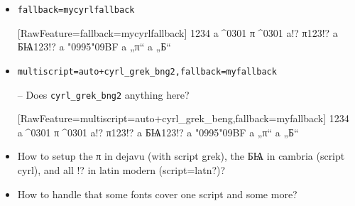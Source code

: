 \documentclass{article}
\newcommand\testtext{1234 a^^^^0301 π^^^^0301 a!? π123!? a БѨ123!? a \char"0995\char"09BF a „π“ a „Б“}
\begin{document}
\begin{itemize}
\item \verb+fallback=mycyrlfallback+

[RawFeature={fallback=mycyrlfallback}]
\testtext

\item \verb!multiscript=auto+cyrl_grek_bng2,fallback=myfallback!

-- Does \verb+cyrl_grek_bng2+ anything here?

[RawFeature={multiscript=auto+cyrl_grek_beng,fallback=myfallback}]
\testtext


\item How to setup the π in dejavu (with script grek), the БѨ in cambria (script cyrl), and all !? in latin modern (script=latn?)?

\item How to handle that some fonts cover one script and some more?
\end{itemize}
\end{document}
